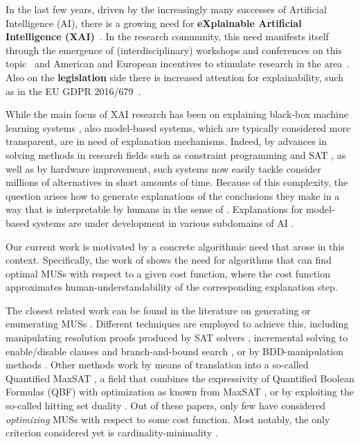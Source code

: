 
In the last few years, driven by the increasingly many successes of Artificial Intelligence (AI), there is a growing need for \textbf{eXplainable Artificial Intelligence (XAI)}~\cite{miller2019explanation}.
In the research community, this need manifests itself through the emergence of (interdisciplinary) workshops and conferences on this topic~\cite{xai-ijcai,FAT} and American and European incentives to stimulate research in the area~\cite{gunning2017explainable,hamonrobustness,chistera,fetproact}. 
Also on the \textbf{legislation} side there is increased attention for explainability, such as in the EU GDPR 2016/679~\cite{regulation2016regulation}.

While the main focus of XAI research has been on explaining black-box machine learning systems \cite{Barredo_Arrieta_2020,Adadi_2018}, also model-based systems, which are typically considered more transparent, are in need of explanation mechanisms. 
Indeed, by advances in solving methods in research fields such as constraint programming \cite{CP} and SAT \cite{SAT}, as well as by hardware improvement, such systems now easily tackle consider millions of alternatives in short amounts of time. 
Because of this complexity, the question arises how to generate explanations of the conclusions they make in a way that is interpretable by humans in the sense of \citet{DBLP:conf/dsaa/GilpinBYBSK18}. 
Explanations for model-based systems are under development in various subdomains of AI \cite{fox2017explainable,vcyras2019argumentation,chakraborti2017plan,winston2004operations,putnam2019toward}.

Our current work is motivated by a concrete algorithmic need that arose in this context. 
Specifically, the work of \citet{ecai/BogaertsGCG20} shows the need for algorithms that can find optimal MUSs with respect to a given cost function, where the cost function approximates human-understandability of the corresponding explanation step.

The closest related work can be found in the literature on generating or enumerating MUSs \cite{conf/sat/LynceM04}.
Different techniques are employed to achieve this, including  manipulating resolution proofs produced by SAT solvers \cite{goldberg,DBLP:journals/fmsd/GershmanKS08,DBLP:conf/sat/DershowitzHN06}, incremental solving to enable/disable clauses and branch-and-bound search \cite{DBLP:conf/dac/OhMASM04}, or by BDD-manipulation methods \cite{huang}.
Other methods work by means of translation into a so-called Quantified MaxSAT \cite{DBLP:journals/constraints/IgnatievJM16}, a field that combines the expressivity of Quantified Boolean Formulas (QBF)  with optimization as known from MaxSAT , or by exploiting the so-called hitting set duality \cite{ignatiev2015smallest}. 
Out of these papers, only few have considered \emph{optimizing} MUSs with respect to some cost function. Most notably, the only criterion considered yet is cardinality-minimality \cite{conf/sat/LynceM04,ignatiev2015smallest,DBLP:journals/constraints/IgnatievJM16}. 

